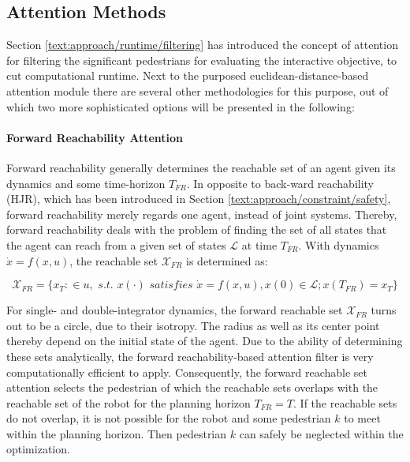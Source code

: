 \subsection{Attention Methods}
Section \ref{text:approach/runtime/filtering} has introduced the concept of attention for filtering the significant pedestrians for evaluating the interactive objective, to cut computational runtime. Next to the purposed euclidean-distance-based attention module there are several other methodologies for this purpose, out of which two more sophisticated options will be presented in the following:

\paragraph{Forward Reachability Attention}
Forward reachability generally determines the reachable set of an agent given its dynamics and some time-horizon $T_{FR}$. In opposite to back-ward reachability (\ac{HJR}), which has been introduced in Section \ref{text:approach/constraint/safety}, forward reachability merely regards one agent, instead of joint systems. Thereby, forward reachability deals with the problem of finding the set of all states that the agent can reach from a given set of states $\mathcal{L}$ at time $T_{FR}$. With dynamics $\dot{x} = f(x, u)$, the reachable set $\mathcal{X}_{FR}$ is determined as:

\begin{equation}
\mathcal{X}_{FR} = \{x_T: \in u, \textit{ s.t. } x(\cdot) \textit{ satisfies } \dot{x} = f(x, u), x(0) \in \mathcal{L}; x(T_{FR}) = x_T\}
\end{equation}
 
For single- and double-integrator dynamics, the forward reachable set $\mathcal{X}_{FR}$ turns out to be a circle, due to their isotropy. The radius as well as its center point thereby depend on the initial state of the agent. Due to the ability of determining these sets analytically, the forward reachability-based attention filter is very computationally efficient to apply.
\newline
Consequently, the forward reachable set attention selects the pedestrian of which the reachable sets overlaps with the reachable set of the robot for the planning horizon $T_{FR} = T$. If the reachable sets do not overlap, it is not possible for the robot and some pedestrian $k$ to meet within the planning horizon. Then pedestrian $k$ can safely be neglected within the optimization.

